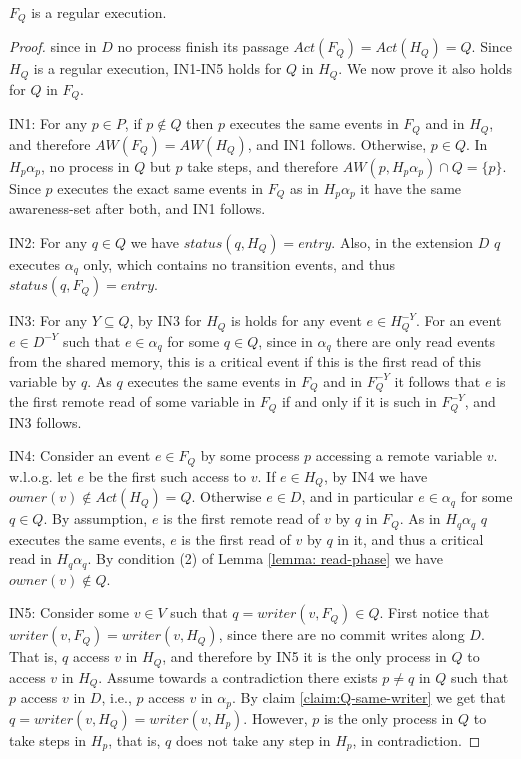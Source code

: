 \begin{claim-subsection}
	$F_Q$ is a regular execution.
\end{claim-subsection}

\begin{proof}
	since in $D$ no process finish its passage $Act(F_Q) = Act(H_Q) = Q$. Since $H_Q$ is a regular execution, IN1-IN5 holds for $Q$ in $H_Q$. We now prove it also holds for $Q$ in $F_Q$.
	
	IN1: For any $p \in P$, if $p \notin Q$ then $p$ executes the same events in $F_Q$ and in $H_Q$, and therefore $AW(F_Q) = AW(H_Q)$, and IN1 follows. Otherwise, $p \in Q$. In $H_p \alpha_p$, no process in $Q$ but $p$ take steps, and therefore $AW(p, H_p \alpha_p) \cap Q = \{p\}$. Since $p$ executes the exact same events in $F_Q$ as in $H_p \alpha_p$ it have the same awareness-set after both, and IN1 follows.
	
	IN2: For any $q \in Q$ we have $status(q,H_Q) = entry$. Also, in the extension $D$ $q$ executes $\alpha_q$ only, which contains no transition events, and thus $status(q,F_Q) = entry$.
	
	IN3: For any $Y \subseteq Q$, by IN3 for $H_Q$ is holds for any event $e \in H_Q^{-Y}$. For an event $e \in D^{-Y}$ such that $e \in \alpha_q$ for some $q \in Q$, since in $\alpha_q$ there are only read events from the shared memory, this is a critical event if this is the first read of this variable by $q$. As $q$ executes the same events in $F_Q$ and in $F_Q^{-Y}$ it follows that $e$ is the first remote read of some variable in $F_Q$ if and only if it is such in $F_Q^{-Y}$, and IN3 follows.
	
	IN4: Consider an event $e \in F_Q$ by some process $p$ accessing a remote variable $v$. w.l.o.g. let $e$ be the first such access to $v$. If $e \in H_Q$, by IN4 we have $owner(v) \notin Act(H_Q) = Q$.
	Otherwise $e \in D$, and in particular $e \in \alpha_q$ for some $q \in Q$. By assumption, $e$ is the first remote read of $v$ by $q$ in $F_Q$. As in $H_q \alpha_q$ $q$ executes the same events, $e$ is the first read of $v$ by $q$ in it, and thus a critical read in $H_q \alpha_q$. By condition (2) of Lemma \ref{lemma: read-phase} we have $owner(v) \notin Q$.
	
	IN5: Consider some $v \in V$ such that $q = writer(v,F_Q) \in Q$. First notice that $writer(v,F_Q) = writer(v,H_Q)$, since there are no commit writes along $D$.
	That is, $q$ access $v$ in $H_Q$, and therefore by IN5 it is the only process in $Q$ to access $v$ in $H_Q$. Assume towards a contradiction there exists $p \neq q$ in $Q$ such that $p$ access $v$ in $D$, i.e., $p$ access $v$ in $\alpha_p$. By claim \ref{claim:Q-same-writer} we get that $q = writer(v,H_Q) = writer(v,H_p)$. However, $p$ is the only process in $Q$ to take steps in $H_p$, that is, $q$ does not take any step in $H_p$, in contradiction.
	
\end{proof}

